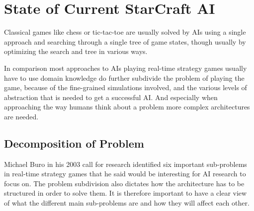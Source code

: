 
\section{State of Current StarCraft AI}
\label{sec:stateofai}

Classical games like chess or tic-tac-toe are usually solved by AIs using a
single approach and searching through a single tree of game states, though
usually by optimizing the search and tree in various ways.

In comparison most approaches to AIs playing real-time strategy games usually
have to use domain knowledge do further subdivide the problem of playing the
game, because of the fine-grained simulations involved, and the various levels
of abstraction that is needed to get a successful AI. And especially when
approaching the way humans think about a problem more complex architectures
are needed.

\subsection{Decomposition of Problem}
Michael Buro in his 2003 call for research \cite{buro2003real} identified six
important sub-problems in real-time strategy games that he said would be
interesting for AI research to focus on. The problem subdivision also dictates
how the architecture has to be structured in order to solve them. It is
therefore important to have a clear view of what the different main sub-problems
are and how they will affect each other.

